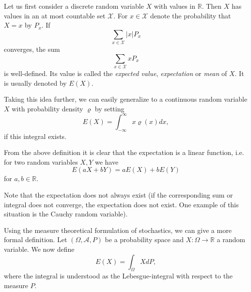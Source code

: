 \documentclass[12pt]{article}
\begin{document}
Let us first consider a discrete random variable $X$ with values in $\mathbb{R}$. Then $X$ has values in an at most countable set $\mathcal{X}$. For $x\in\mathcal{X}$ denote the probability that $X=x$ by $P_x$. If
$$\sum_{x\in\mathcal{X}}|x|P_x$$
converges, the sum
$$\sum_{x\in\mathcal{X}}xP_x$$
is well-defined. Its value is called the \emph{expected value}, \emph{expectation} or \emph{mean} of $X$. It is usually denoted by $E(X)$.

Taking this idea further, we can easily generalize to a continuous random variable $X$ with probability density $\varrho$ by setting
$$E(X)=\int_{-\infty}^\infty x\varrho(x)dx,$$
if this integral exists.

From the above definition it is clear that the expectation is a linear function, i.e. for two random variables $X, Y$ we have
$$E(aX+bY)=aE(X)+bE(Y)$$
for $a,b\in\mathbb{R}$. 

Note that the expectation does not always exist (if the corresponding sum or integral does not converge, the expectation does not exist. One example of this situation is the Cauchy random variable).

Using the measure theoretical formulation of stochastics, we can give a more formal definition. Let $(\Omega, \mathcal{A}, P)$ be a probability space and $X:\Omega\to\mathbb{R}$ a random variable. We now define
$$E(X)=\int_{\Omega} XdP,$$
where the integral is understood as the Lebesgue-integral with respect to the measure $P$. 
\end{document}

